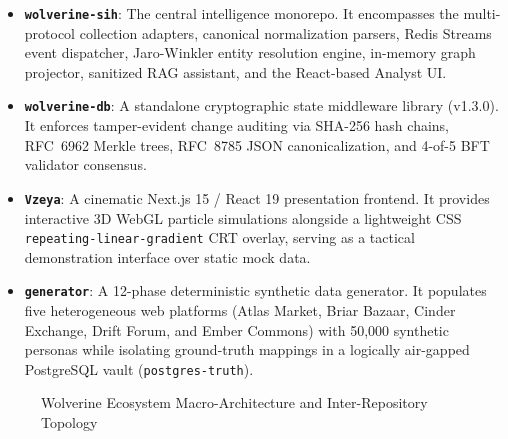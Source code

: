 \begin{itemize}
    \item \textbf{\texttt{wolverine-sih}}: The central intelligence monorepo. It encompasses the multi-protocol collection adapters, canonical normalization parsers, Redis Streams event dispatcher, Jaro-Winkler entity resolution engine, in-memory graph projector, sanitized RAG assistant, and the React-based Analyst UI.
    \item \textbf{\texttt{wolverine-db}}: A standalone cryptographic state middleware library (v1.3.0). It enforces tamper-evident change auditing via SHA-256 hash chains, RFC~6962 Merkle trees, RFC~8785 JSON canonicalization, and 4-of-5 BFT validator consensus.
    \item \textbf{\texttt{Vzeya}}: A cinematic Next.js 15 / React 19 presentation frontend. It provides interactive 3D WebGL particle simulations alongside a lightweight CSS \texttt{repeating-linear-gradient} CRT overlay, serving as a tactical demonstration interface over static mock data.
    \item \textbf{\texttt{generator}}: A 12-phase deterministic synthetic data generator. It populates five heterogeneous web platforms (Atlas Market, Briar Bazaar, Cinder Exchange, Drift Forum, and Ember Commons) with 50,000 synthetic personas while isolating ground-truth mappings in a logically air-gapped PostgreSQL vault (\texttt{postgres-truth}).
\end{itemize}

\begin{figure}[htpb]
\centering
{}
\caption{Wolverine Ecosystem Macro-Architecture and Inter-Repository Topology}
\label{fig:architecture}
\end{figure}

